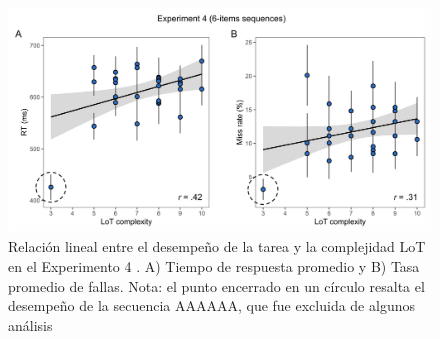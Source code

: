 \begin{figure}[t!]
      \includegraphics[scale=0.8]{figuras/plosbio/journal.pcbi.1008598.s006.png}
      \centering
      \caption{Relación lineal entre el desempeño de la tarea y la complejidad LoT en el Experimento 4 . A) Tiempo de respuesta promedio y B) Tasa promedio de fallas. Nota: el punto encerrado en un círculo resalta el desempeño de la secuencia AAAAAA, que fue excluida de algunos análisis}
      \label{PlosBIO-S6}
\end{figure}

